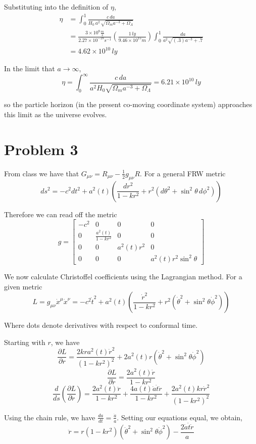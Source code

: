 \documentclass{article}
\begin{document}
Substituting into the definition of $\eta$, 
\begin{align*}
\eta &= \int_0^1 \frac{c\,da}{H_0\,a^2\,\sqrt{\Omega_ma^{-3}+\Omega_\Lambda}} \\
&= \frac{3\times 10^8 \frac{m}{s}}{2.27\times 10^{-18}s^{-1}}\left(\frac{1\,ly}{9.46\times 10^{15} m}\right)\int_0^1 \frac{da}{a^2\sqrt{(.3)a^{-3}+.7}}\\
&=4.62\times 10^{10}\,ly
\end{align*}

In the limit that $a\rightarrow\infty$,
\[\eta = \int_0^{\infty}\frac{c\,da}{a^2 H_0 \sqrt{\Omega_m a^{-3} + \Omega_{\Lambda}}}= 6.21\times 10^{10}\,ly\]

so the particle horizon (in the present co-moving coordinate system) approaches this limit as the universe evolves.

\section*{Problem 3}
From class we have that $G_{\mu\nu} = R_{\mu\nu}-\frac{1}{2}g_{\mu\nu}R$.
For a general FRW metric
\[ds^2 = -c^2dt^2 + a^2(t)\left(\frac{dr^2}{1-kr^2}+r^2(d\theta^2+\sin^2\theta\,d\phi^2)\right)\]

Therefore we can read off the metric
\[g = \begin{bmatrix} -c^2&0&0&0\\0 &\frac{a^2(t)}{1-kr^2}&0&0\\0&0&a^2(t)r^2&0\\0&0&0&a^2(t)r^2\sin^2\theta\end{bmatrix}\]

We now calculate Christoffel coefficients using the Lagrangian method. For a given metric
\[L = g_{\mu\nu}\dot{x}^\mu\dot{x}^\nu = -c^2\dot{t}^2 + a^2(t)\left(\frac{\dot{r}^2}{1-kr^2}+r^2(\dot{\theta}^2+\sin^2\theta\dot{\phi}^2)\right)\]

Where dots denote derivatives with respect to conformal time.

Starting with $r$, we have
\[\frac{\partial L}{\partial r} = \frac{2kra^2(t)\dot{r}^2}{(1-kr^2)^2}+2a^2(t)r(\dot{\theta}^2+\sin^2\theta\dot{\phi}^2)\]
\[\frac{\partial L}{\partial \dot{r}} = \frac{2a^2(t)\dot{r}}{1-kr^2}\]
\[\frac{d}{ds}\left(\frac{\partial L}{\partial \dot{r}}\right)= \frac{2a^2(t)\ddot{r}}{1-kr^2}+\frac{4a(t)\dot{a}\dot{t}\dot{r}}{1-kr^2} + \frac{2a^2(t)kr\dot{r}^2}{(1-kr^2)^2} \]

Using the chain rule, we have $\frac{da}{dt} = \frac{\dot{a}}{a}$. Setting our equations equal, we obtain,
\[\ddot{r} = r(1-kr^2)(\dot{\theta}^2+\sin^2\theta\dot{\phi}^2)-\frac{2\dot{a}\dot{t}\dot{r}}{a}\]
\end{document}
